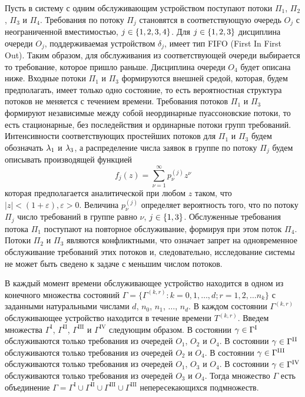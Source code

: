 \documentclass[a4paper,12pt,russian]{extarticle}
\newcommand{\G}{\Gamma}
\newcommand{\ga}[1]{\Gamma^{\left( #1 \right)} }
\newcommand{\Tt}[1]{T^{\left( #1 \right)} }
\begin{document}
Пусть в систему с одним обслуживающим устройством поступают потоки $\Pi_1$, $\Pi_2$, $\Pi_3$  и $\Pi_4$. Требования по потоку $\Pi_j$ становятся в соответствующую очередь $O_j$ с неограниченной вместимостью, $j\in \left\{1, 2, 3, 4\right\}$. Для $j \in \left\{1, 2, 3\right\}$ дисциплина очереди $O_j$, поддерживаемая устройством $\delta_j$, имеет тип FIFO (First In First Out). Таким образом, для обслуживания из соответствующей очереди выбирается то требование, которое пришло раньше. Дисциплина очереди $O_4$ будет описана ниже. Входные потоки $\Pi_1$ и $\Pi_3$ формируются внешней средой, которая, будем предполагать, имеет только одно состояние, то есть вероятностная структура потоков не меняется с течением времени. Требования потоков $\Pi_1$ и $\Pi_3$ формируют независимые между собой неординарные пуассоновские потоки, то есть  стационарные, без последействия и ординарные потоки групп требований. Интенсивности соответствующих простейших потоков для $\Pi_1$ и $\Pi_3$ будем обозначать $\lambda_1$ и $\lambda_3$, а распределение числа заявок в группе по потоку $\Pi_j$ будем описывать производящей функцией
\begin{equation}
f_j(z) = \sum_{\nu=1}^{\infty} p_{\nu}^{(j)} z ^{\nu}
\label{GeneratingFunc}
\end{equation}
которая предполагается аналитической при любом $z$ таком, что $|z|<(1+\varepsilon), \varepsilon > 0$. Величина $p_{\nu}^{(j)}$ определяет вероятность того, что по потоку $\Pi_j$ число требований в группе равно $\nu$, $j\in \left\{1,3\right\}$. Обслуженные требования потока $\Pi_1$ поступают на повторное обслуживание, формируя при этом поток $\Pi_4$. Потоки $\Pi_2$ и $\Pi_3$ являются конфликтными, что означает запрет на одновременное обслуживание требований этих потоков и, следовательно, исследование системы не может быть сведено к задаче с меньшим числом потоков. 
 
 В каждый момент времени обслуживающее устройство находится в одном из конечного множества состояний $\Gamma=\{\G^{(k,r)} \colon k=0,1,\ldots,d; r=1,2,\ldots n_k\}$ с заданными натуральными числами $d$, $n_0$, $n_1$, $\ldots$, $n_d$. В каждом состоянии $\ga{k,r}$ обслуживающее устройство находится в течение времени $\Tt{k,r}$. Введем множества $\G^{\mathrm{I}}$, $\G^{\mathrm{II}}$, $\G^{\mathrm{III}}$ и $\G^{\mathrm{IV}}$ следующим образом. В состоянии $\gamma \in \G^{\mathrm{\Rmnum{1}}}$ обслуживаются только требования из очередей $O_1$, $O_2$ и $O_4$.
В состоянии $\gamma \in \G^{\mathrm{\Rmnum{2}}}$ обслуживаются только требования из очередей $O_2$ и $O_4$.
В состоянии $\gamma \in \G^{\mathrm{\Rmnum{3}}}$ обслуживаются только требования из очередей $O_1$, $O_3$ и $O_4$.
В состоянии $\gamma \in \G^{\mathrm{\Rmnum{4}}}$ обслуживаются только требования из очередей $O_3$ и $O_4$.
Тогда множество $\G$ есть объединение $\G = \G^{\mathrm{I}} \cup \G^{\mathrm{II}} \cup \G^{\mathrm{III}} \cup \G^{\mathrm{III}}$ непересекающихся подмножеств. 
\end{document}
